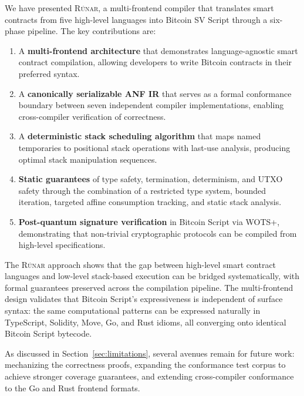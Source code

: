 \documentclass[11pt,a4paper]{article}
\newcommand{\runar}{\textsc{Rúnar}}
\begin{document}
We have presented \runar{}, a multi-frontend compiler that translates smart
contracts from five high-level languages into Bitcoin SV Script through a
six-phase pipeline. The key contributions are:

\begin{enumerate}[label=(\roman*)]
  \item A \textbf{multi-frontend architecture} that demonstrates
    language-agnostic smart contract compilation, allowing developers to
    write Bitcoin contracts in their preferred syntax.
  \item A \textbf{canonically serializable ANF IR} that serves as a formal
    conformance boundary between seven independent compiler implementations,
    enabling cross-compiler verification of correctness.
  \item A \textbf{deterministic stack scheduling algorithm} that maps named
    temporaries to positional stack operations with last-use analysis,
    producing optimal stack manipulation sequences.
  \item \textbf{Static guarantees} of type safety, termination, determinism,
    and UTXO safety through the combination of a restricted type system,
    bounded iteration, targeted affine consumption tracking, and static
    stack analysis.
  \item \textbf{Post-quantum signature verification} in Bitcoin Script
    via WOTS+, demonstrating that non-trivial cryptographic protocols can
    be compiled from high-level specifications.
\end{enumerate}

The \runar{} approach shows that the gap between high-level smart contract
languages and low-level stack-based execution can be bridged systematically,
with formal guarantees preserved across the compilation pipeline. The
multi-frontend design validates that Bitcoin Script's expressiveness is
independent of surface syntax: the same computational patterns can be
expressed naturally in TypeScript, Solidity, Move, Go, and Rust idioms,
all converging onto identical Bitcoin Script bytecode.

As discussed in Section~\ref{sec:limitations}, several avenues remain for
future work: mechanizing the correctness proofs, expanding the conformance
test corpus to achieve stronger coverage guarantees, and extending
cross-compiler conformance to the Go and Rust frontend formats.

\end{document}
